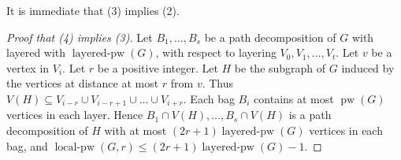 \documentclass[a4paper,11pt]{article}
\DeclareMathOperator{\pw}{pw}
\DeclareMathOperator{\pb}{layered-pw}
\DeclareMathOperator{\lpw}{local-pw}
\theoremstyle{plain}
\theoremstyle{definition}
\begin{document}
It is immediate that (3) implies (2).

%
%
%

\begin{proof}[Proof that (4) implies (3)] 
Let $B_1,\dots,B_s$ be a path decomposition of $G$ with layered with $\pb(G)$, with respect to layering $V_0,V_1,\dots,V_t$. Let $v$ be a vertex in $V_i$. Let $r$ be a positive integer. Let $H$ be the subgraph of $G$ induced by the vertices at distance at most $r$ from $v$. Thus $V(H)\subseteq V_{i-r}\cup V_{i-r+1}\cup\dots\cup V_{i+r}$. Each bag $B_i$ contains at most $\pw(G)$ vertices in each layer. Hence $B_1\cap V(H),\dots,B_s\cap V(H)$ is a path decomposition of $H$ with at most $(2r+1)\pb(G)$ vertices in each bag, and  $\lpw(G,r)\leq(2r+1)\pb(G)-1$.  
\end{proof}
\end{document}
